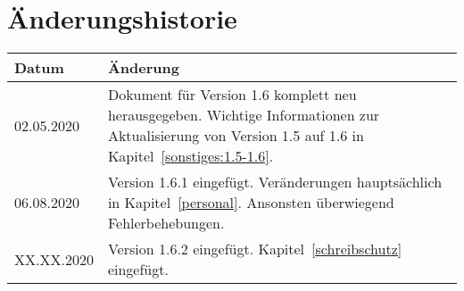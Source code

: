 \chapter{Änderungshistorie}
\begin{tabularx}{\textwidth}{l|X}
  Datum & Änderung \\
  \hline
  \hline
  02.05.2020 &
    Dokument für Version 1.6 komplett neu herausgegeben.\newline
    Wichtige Informationen zur Aktualisierung von Version 1.5 auf 1.6 in Kapitel~\ref{sonstiges:1.5-1.6}.\\
  \hline
  06.08.2020 &
    Version 1.6.1 eingefügt.\newline
    Veränderungen hauptsächlich in Kapitel~\ref{personal}.
    Ansonsten überwiegend Fehlerbehebungen.
    \\
  \hline
  XX.XX.2020 &
    Version 1.6.2 eingefügt.\newline
    Kapitel~\ref{schreibschutz} eingefügt.
\end{tabularx}
